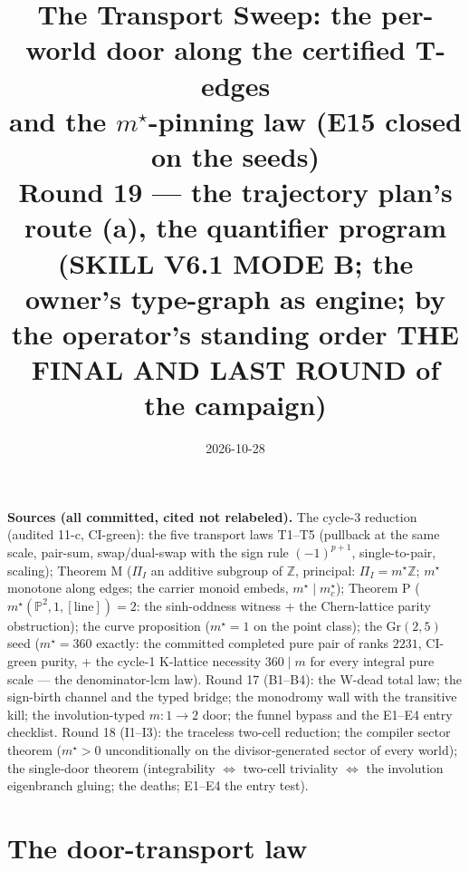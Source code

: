 \documentclass[11pt]{article}
\title{The Transport Sweep: the per-world door along the certified T-edges\\
and the $m^\star$-pinning law (E15 closed on the seeds)\\
{\large Round 19 --- the trajectory plan's route (a), the quantifier program\\
(SKILL V6.1 MODE B; the owner's type-graph as engine; by the operator's standing
order THE FINAL AND LAST ROUND of the campaign)}}
\date{2026-10-28}
\begin{document}
\maketitle

\noindent\textbf{Sources (all committed, cited not relabeled).}
The cycle-3 reduction (audited 11-c, CI-green): the five transport laws
T1--T5 (pullback at the same scale, pair-sum, swap/dual-swap with the sign rule
$(-1)^{p+1}$, single-to-pair, scaling); Theorem M ($\Pi_I$ an additive subgroup
of $\mathbb Z$, principal: $\Pi_I=m^\star\mathbb Z$; $m^\star$ monotone along
edges; the carrier monoid embeds, $m^\star\mid m^\star_c$); Theorem P
($m^\star(\mathbb P^2,1,[\mathrm{line}])=2$: the sinh-oddness witness + the
Chern-lattice parity obstruction); the curve proposition ($m^\star=1$ on the
point class); the $\mathrm{Gr}(2,5)$ seed ($m^\star=360$ exactly: the committed
completed pure pair of ranks $2231$, CI-green purity, + the cycle-1 K-lattice
necessity $360\mid m$ for every integral pure scale --- the denominator-lcm law).
Round 17 (B1--B4): the W-dead total law; the sign-birth channel and the typed
bridge; the monodromy wall with the transitive kill; the involution-typed
$m{:}1\to2$ door; the funnel bypass and the E1--E4 entry checklist.
Round 18 (I1--I3): the traceless two-cell reduction; the compiler sector theorem
($m^\star>0$ unconditionally on the divisor-generated sector of every world);
the single-door theorem (integrability $\iff$ two-cell triviality $\iff$ the
involution eigenbranch gluing; the deaths; E1--E4 the entry test).

\section{The door-transport law}
\end{document}
